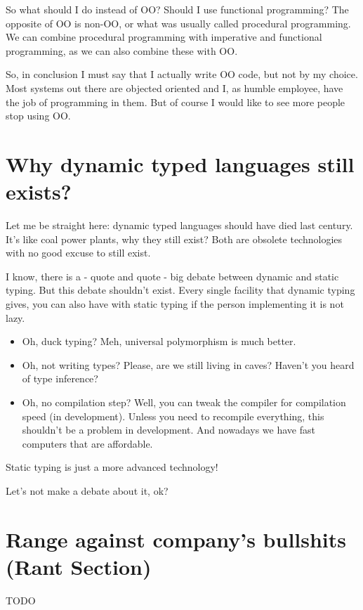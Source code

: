 \documentclass[11pt,a4paper,sans]{moderncv}
\begin{document}
So what should I do instead of OO?
Should I use functional programming?
The opposite of OO is non-OO, or what was usually called procedural programming.
We can combine procedural programming with imperative and functional programming, as we can also combine these with OO.

So, in conclusion I must say that I actually write OO code, but not by my choice.
Most systems out there are objected oriented and I, as humble employee, have the job of programming in them.
But of course I would like to see more people stop using OO.

\section{Why dynamic typed languages still exists?}
Let me be straight here:
dynamic typed languages should have died last century.
It's like coal power plants, why they still exist?
Both are obsolete technologies with no good excuse to still exist.

I know, there is a - quote and quote - big debate between dynamic and static typing.
But this debate shouldn't exist.
Every single facility that dynamic typing gives, you can also have with static typing if the person implementing it is not lazy.

\begin{itemize}
  \item Oh, duck typing? Meh, universal polymorphism is much better.
  \item Oh, not writing types? Please, are we still living in caves? Haven't you heard of type inference?
  \item Oh, no compilation step? Well, you can tweak the compiler for compilation speed (in development).
        Unless you need to recompile everything, this shouldn't be a problem in development.
        And nowadays we have fast computers that are affordable.
\end{itemize}

Static typing is just a more advanced technology!

Let's not make a debate about it, ok?

\section{Range against company's bullshits (Rant Section)}
TODO
\end{document}
